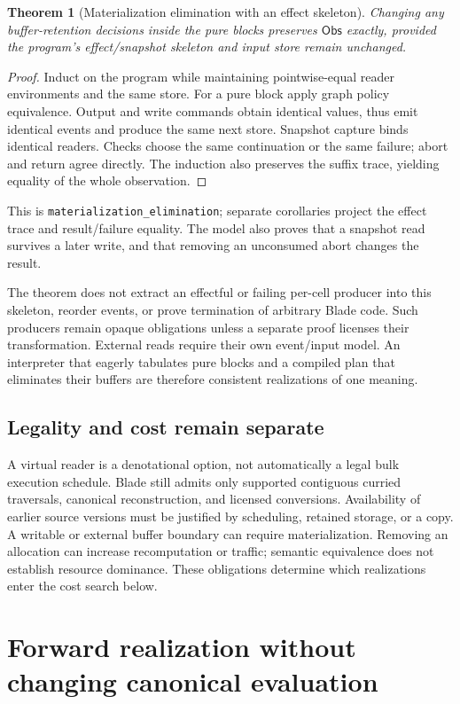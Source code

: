 \documentclass[11pt]{article}
\newtheorem{theorem}{Theorem}
\begin{document}
\begin{theorem}[Materialization elimination with an effect skeleton]
Changing any buffer-retention decisions inside the pure blocks preserves
$\mathsf{Obs}$ exactly, provided the program's effect/snapshot skeleton and
input store remain unchanged.
\end{theorem}
\begin{proof}
Induct on the program while maintaining pointwise-equal reader environments
and the same store. For a pure block apply graph policy equivalence. Output and
write commands obtain identical values, thus emit identical events and produce
the same next store. Snapshot capture binds identical readers. Checks choose
the same continuation or the same failure; abort and return agree directly.
The induction also preserves the suffix trace, yielding equality of the whole
observation.
\end{proof}
This is \texttt{materialization\_elimination}; separate corollaries project
the effect trace and result/failure equality. The model also proves that a
snapshot read survives a later write, and that removing an unconsumed abort
changes the result.

The theorem does not extract an effectful or failing per-cell producer into
this skeleton, reorder events, or prove termination of arbitrary Blade code.
Such producers remain opaque obligations unless a separate proof licenses
their transformation. External reads require their own event/input model.
An interpreter that eagerly tabulates pure blocks and a compiled plan that
eliminates their buffers are therefore consistent realizations of one meaning.

\subsection{Legality and cost remain separate}
A virtual reader is a denotational option, not automatically a legal bulk
execution schedule. Blade still admits only supported contiguous curried
traversals, canonical reconstruction, and licensed conversions. Availability
of earlier source versions must be justified by scheduling, retained storage,
or a copy. A writable or external buffer boundary can require materialization.
Removing an allocation can increase recomputation or traffic; semantic
equivalence does not establish resource dominance. These obligations determine
which realizations enter the cost search below.

\section{Forward realization without changing canonical evaluation}
\end{document}
